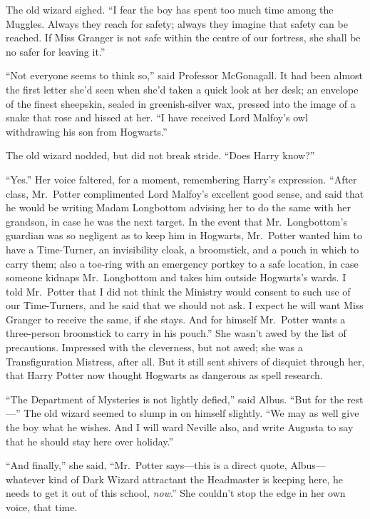 The old wizard sighed. ``I fear the boy has spent too much time among
the Muggles. Always they reach for safety; always they imagine that
safety can be reached. If Miss Granger is not safe within the centre of
our fortress, she shall be no safer for leaving it.''

``Not everyone seems to think so,'' said Professor McGonagall. It had
been almost the first letter she'd seen when she'd taken a quick look at
her desk; an envelope of the finest sheepskin, sealed in greenish-silver
wax, pressed into the image of a snake that rose and hissed at her. ``I
have received Lord Malfoy's owl withdrawing his son from Hogwarts.''

The old wizard nodded, but did not break stride. ``Does Harry know?''

``Yes.'' Her voice faltered, for a moment, remembering Harry's
expression. ``After class, Mr.~Potter complimented Lord Malfoy's
excellent good sense, and said that he would be writing Madam Longbottom
advising her to do the same with her grandson, in case he was the next
target. In the event that Mr.~Longbottom's guardian was so negligent as
to keep him in Hogwarts, Mr.~Potter wanted him to have a Time-Turner, an
invisibility cloak, a broomstick, and a pouch in which to carry them;
also a toe-ring with an emergency portkey to a safe location, in case
someone kidnaps Mr.~Longbottom and takes him outside Hogwarts's wards. I
told Mr.~Potter that I did not think the Ministry would consent to such
use of our Time-Turners, and he said that we should not ask. I expect he
will want Miss Granger to receive the same, if she stays. And for
himself Mr.~Potter wants a three-person broomstick to carry in his
pouch.'' She wasn't awed by the list of precautions. Impressed with the
cleverness, but not awed; she was a Transfiguration Mistress, after all.
But it still sent shivers of disquiet through her, that Harry Potter now
thought Hogwarts as dangerous as spell research.

``The Department of Mysteries is not lightly defied,'' said Albus. ``But
for the rest---'' The old wizard seemed to slump in on himself slightly.
``We may as well give the boy what he wishes. And I will ward Neville
also, and write Augusta to say that he should stay here over holiday.''

``And finally,'' she said, ``Mr.~Potter says---this is a direct quote,
Albus---whatever kind of Dark Wizard attractant the Headmaster is
keeping here, he needs to get it out of this school, \emph{now}.'' She
couldn't stop the edge in her own voice, that time.

